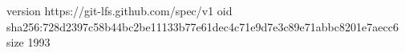 version https://git-lfs.github.com/spec/v1
oid sha256:728d2397c58b44bc2be11133b77e61dec4c71e9d7e3c89e71abbc8201e7aecc6
size 1993
